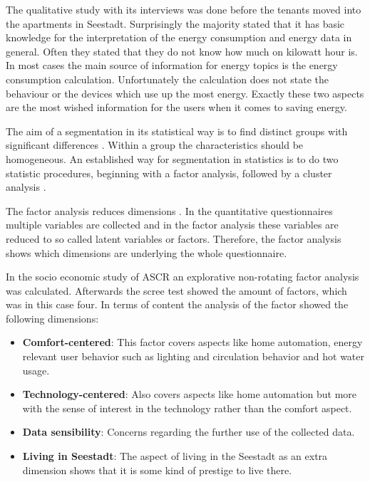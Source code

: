 The qualitative study with its interviews was done before the tenants moved into the apartments in Seestadt. Surprisingly the majority stated that it has basic knowledge for the interpretation of the energy consumption and energy data in general. Often they stated that they do not know how much on kilowatt hour is. In most cases the main source of information for energy topics is the energy consumption calculation. Unfortunately the calculation does not state the behaviour or the devices which use up the most energy. Exactly these two aspects are the most wished information for the users when it comes to saving energy.

The aim of a segmentation in its statistical way is to find distinct groups with significant differences \cite{punj1983cluster}. Within a group the characteristics should be homogeneous. An established way for segmentation in statistics is to do two statistic procedures, beginning with a factor analysis, followed by a cluster analysis \cite{tuffery2011data}.

The factor analysis reduces dimensions \cite{williams2010exploratory}. In the quantitative questionnaires multiple variables are collected and in the factor analysis these variables are reduced to so called latent variables or factors. Therefore, the factor analysis shows which dimensions are underlying the whole questionnaire.

In the socio economic study of ASCR an explorative non-rotating factor analysis was calculated. Afterwards the scree test showed the amount of factors, which was in this case four. In terms of content the analysis of the factor showed the following dimensions:

\begin{itemize}
	\item \textbf{Comfort-centered}: This factor covers aspects like home automation, energy relevant user behavior such as lighting and circulation behavior and hot water usage. 
	\item \textbf{Technology-centered}: Also covers aspects like home automation but more with the sense of interest in the technology rather than the comfort aspect.
	\item \textbf{Data sensibility}: Concerns regarding the further use of the collected data.
	\item \textbf{Living in Seestadt}: The aspect of living in the Seestadt as an extra dimension shows that it is some kind of prestige to live there.
\end{itemize}

